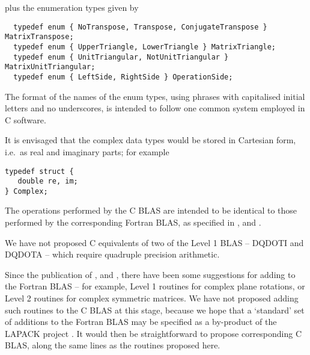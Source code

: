 plus the enumeration types given by
\footnotesize
\begin{verbatim}
  typedef enum { NoTranspose, Transpose, ConjugateTranspose } MatrixTranspose;
  typedef enum { UpperTriangle, LowerTriangle } MatrixTriangle;
  typedef enum { UnitTriangular, NotUnitTriangular } MatrixUnitTriangular;
  typedef enum { LeftSide, RightSide } OperationSide;
\end{verbatim}
\normalsize
The format of the names of the enum types, using phrases with
capitalised initial letters and no underscores, is intended to follow
one common system employed in C software. 

It is envisaged that the complex data types would be stored in Cartesian
form, i.e.~as real and imaginary parts; for example 
\begin{verbatim}
typedef struct {        
   double re, im;       
} Complex;
\end{verbatim}
The operations performed by the C BLAS are intended to be identical to
those performed by the corresponding Fortran BLAS, as specified in 
\cite{DODSON}, \cite{DONGAR2} and \cite{DONGAR3}. 

We have not proposed C equivalents of two of the Level 1 BLAS -- \break
DQDOTI
and DQDOTA -- which require quadruple precision arithmetic. 

Since the publication of \cite{DODSON}, \cite{DONGAR2} and 
\cite{DONGAR3}, there have been some suggestions for adding to 
the Fortran BLAS -- for example, Level 1 routines for complex plane
rotations, or Level 2 routines for complex symmetric matrices.  We have
not proposed adding such routines to the C BLAS at this stage, because
we hope that a `standard' set of additions to the Fortran BLAS may be
specified as a by-product of the LAPACK project \cite{ANDER}.  It would
then be straightforward to propose corresponding C BLAS, along the same
lines as the routines proposed here. 

